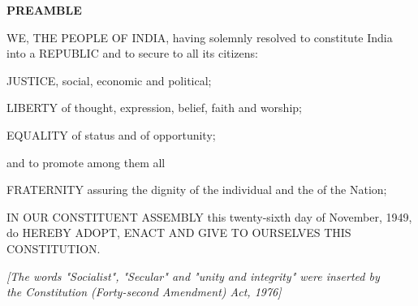 
\thispagestyle{empty}
\vspace*{2cm}

\begin{center}
    {\LARGE\bfseries PREAMBLE}
\end{center}

\vspace{2cm}

\begin{center}
    \parbox{0.8\textwidth}{%
        \centering
        \large
        WE, THE PEOPLE OF INDIA, having solemnly resolved to constitute India into a 
        REPUBLIC and to secure to all its citizens:
        
        \vspace{1em}
        
        JUSTICE, social, economic and political;
        
        \vspace{0.5em}
        
        LIBERTY of thought, expression, belief, faith and worship;
        
        \vspace{0.5em}
        
        EQUALITY of status and of opportunity;
        
        \vspace{0.5em}
        
        and to promote among them all
        
        \vspace{0.5em}
        
        FRATERNITY assuring the dignity of the individual and the 
        of the Nation;
        
        \vspace{1.5em}
        
        IN OUR CONSTITUENT ASSEMBLY this twenty-sixth day of November, 1949, do 
        HEREBY ADOPT, ENACT AND GIVE TO OURSELVES THIS CONSTITUTION.
    }
\end{center}

\vfill

\begin{center}
    \textit{[The words "Socialist", "Secular" and "unity and integrity" were inserted by\\
    the Constitution (Forty-second Amendment) Act, 1976]}
\end{center}

\clearpage